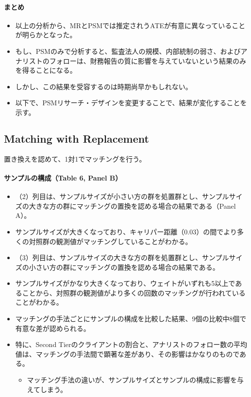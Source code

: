 \paragraph{まとめ}
\begin{itemize}
 \item 以上の分析から、MRとPSMでは推定されうATEが有意に異なっていることが明らかとなった。
 \item もし、PSMのみで分析すると、監査法人の規模、内部統制の弱さ、およびアナリストのフォローは、財務報告の質に影響を与えていないという結果のみを得ることになる。
 \item しかし、この結果を受容するのは時期尚早かもしれない。
 \item 以下で、PSMリサーチ・デザインを変更することで、結果が変化することを示す。
\end{itemize}


\subsection*{Matching with Replacement}

置き換えを認めて、1対1でマッチングを行う。

\paragraph{サンプルの構成（Table 6, Panel B）}

\begin{itemize}
 \item （2）列目は、サンプルサイズが小さい方の群を処置群とし、サンプルサイズの大きな方の群にマッチングの置換を認める場合の結果である（Panel A）。
 \item サンプルサイズが大きくなっており、キャリパー距離（0.03）の間でより多くの対照群の観測値がマッチングしていることがわかる。
 \item （3）列目は、サンプルサイズの大きな方の群を処置群とし、サンプルサイズの小さい方の群にマッチングの置換を認める場合の結果である。
 \item サンプルサイズがかなり大きくなっており、ウェイトがいずれも5以上であることから、対照群の観測値がより多くの回数のマッチングが行われていることがわかる。
 \item マッチングの手法ごとにサンプルの構成を比較した結果、9個の比較中8個で有意な差が認められる。
 \item 特に、Second Tierのクライアントの割合と、アナリストのフォロー数の平均値は、マッチングの手法間で顕著な差があり、その影響はかなりのものである。
  \begin{itemize}
   \item マッチング手法の違いが、サンプルサイズとサンプルの構成に影響を与えてしまう。
  \end{itemize}
\end{itemize}

